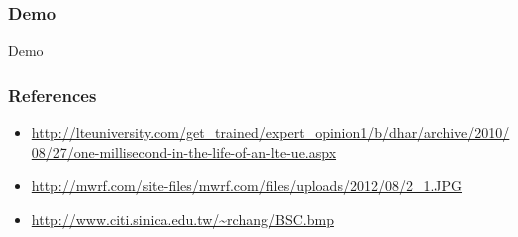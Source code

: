 \documentclass{beamer}
\begin{document}

\begin{frame}
\frametitle{Demo}
\Huge{\centerline{Demo}}
\end{frame}


\begin{frame}
\frametitle{References}
\begin{itemize}
\item \url{http://lteuniversity.com/get_trained/expert_opinion1/b/dhar/archive/2010/08/27/one-millisecond-in-the-life-of-an-lte-ue.aspx}
\item \url{http://mwrf.com/site-files/mwrf.com/files/uploads/2012/08/2_1.JPG}
\item \url{http://www.citi.sinica.edu.tw/~rchang/BSC.bmp}
\end{itemize}
\end{frame}

\end{document}
